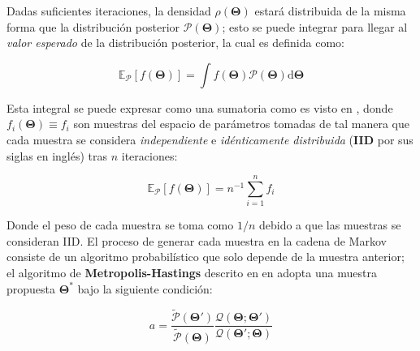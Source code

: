 Dadas suficientes iteraciones, la densidad $\rho(\mathbf{\Theta})$ estará
distribuida de la misma forma que la distribución posterior
$\mathcal{P}(\mathbf{\Theta})$; esto se puede integrar para llegar al
\textit{valor esperado} de la distribución posterior, la cual es definida como:

\begin{eqfloat}[!ht]
	\centering
	\begin{equation}
		\mathbb{E}_{\mathcal{P}}\left[f(\mathbf{\Theta})\right] = \int{f(\mathbf{\Theta}) \mathcal{P}(\mathbf{\Theta}) \textrm{d}\mathbf{\Theta}}
	\end{equation}
\end{eqfloat}

Esta integral se puede expresar como una sumatoria como es visto en , donde $f_i(\mathbf{\Theta})
\equiv f_i$ son muestras del espacio de parámetros tomadas de tal manera que
cada muestra se considera \textit{independiente} e \textit{idénticamente
distribuida} (\textbf{IID} por sus siglas en inglés) tras $n$ iteraciones:

\begin{eqfloat}[!ht]
	\centering
	\begin{equation}
		\mathbb{E}_{\mathcal{P}}\left[f(\mathbf{\Theta})\right] = n^{-1} \sum_{i=1}^{n}{f_i}
	\end{equation}
\end{eqfloat}

Donde el peso de cada muestra se toma como $1/n$ debido a que las muestras se
consideran IID. El proceso de generar cada muestra en la cadena de Markov
consiste de un algoritmo probabilístico que solo depende de la muestra anterior;
el algoritmo de \textbf{Metropolis-Hastings} descrito en en
adopta una muestra propuesta $\mathbf{\Theta}^*$ bajo la siguiente condición:

\begin{eqfloat}[!ht]
	\centering
	\begin{equation}
		a = \frac{\tilde{\mathcal{P}}(\mathbf{\Theta}')}{\tilde{\mathcal{P}}(\mathbf{\Theta})} \frac{\mathcal{Q}(\mathbf{\Theta} ; \mathbf{\Theta}')}{\mathcal{Q}(\mathbf{\Theta}' ; \mathbf{\Theta})}
	\end{equation}
\end{eqfloat}

